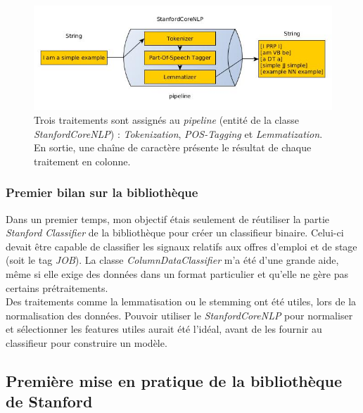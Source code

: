             \begin{figure}[h!]
                \centering
                \includegraphics[width=\textwidth]{images/coreNLP.jpg}
                \caption{Trois traitements sont assignés au \textit{pipeline} (entité de la classe \textit{StanfordCoreNLP}) : \textit{Tokenization}, \textit{POS-Tagging} et \textit{Lemmatization}. En sortie, une chaîne de caractère présente le résultat de chaque traitement en colonne.}
                \label{fig:coreNLP}
            \end{figure}

            \subsubsection{Premier bilan sur la bibliothèque}
                Dans un premier temps, mon objectif étais seulement de réutiliser la partie \textit{Stanford Classifier} de la bibliothèque pour créer un classifieur binaire. Celui-ci devait être capable de classifier les signaux relatifs aux offres d'emploi et de stage (soit le tag \textit{JOB}). La classe \textit{ColumnDataClassifier} m'a été d'une grande aide, même si elle exige des données dans un format particulier et qu'elle ne gère pas certains prétraitements.\\

                Des traitements comme la lemmatisation ou le stemming ont été utiles, lors de la normalisation des données. Pouvoir utiliser le \textit{StanfordCoreNLP} pour normaliser et sélectionner les features utiles aurait été l'idéal, avant de les fournir au classifieur pour construire un modèle.

        \subsection{Première mise en pratique de la bibliothèque de Stanford}
        \label{ssec:premiere_mise_en_appli}
